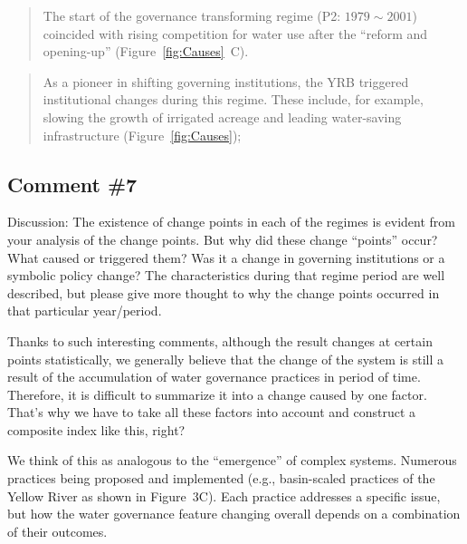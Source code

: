 \begin{quote}
    The start of the governance transforming regime (P2: $1979 \sim 2001$) coincided with rising competition for water use after the ``reform and opening-up'' (Figure~\ref{fig:Causes}~C).
\end{quote}

\begin{quote}
    As a pioneer in shifting governing institutions, the YRB triggered institutional changes during this regime. These include, for example, slowing the growth of irrigated acreage and leading water-saving infrastructure (Figure~\ref{fig:Causes});
\end{quote}

\subsection{Comment \#7}
\RC{} Discussion: The existence of change points in each of the regimes is evident from your analysis of the change points. But why did these change ``points'' occur? What caused or triggered them? Was it a change in governing institutions or a symbolic policy change? The characteristics during that regime period are well described, but please give more thought to why the change points occurred in that particular year/period.

\AR{} Thanks to such interesting comments, although the result changes at certain points statistically, we generally believe that the change of the system is still a result of the accumulation of water governance practices in period of time. Therefore, it is difficult to summarize it into a change caused by one factor. That's why we have to take all these factors into account and construct a composite index like this, right?

\AR*{} We think of this as analogous to the ``emergence'' of complex systems. Numerous practices being proposed and implemented (e.g., basin-scaled practices of the Yellow River as shown in Figure~3C). Each practice addresses a specific issue, but how the water governance feature changing overall depends on a combination of their outcomes.

